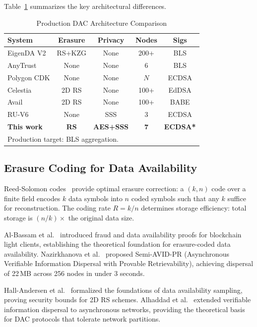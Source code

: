 Table~\ref{tab:dac-comparison} summarizes the key architectural
differences.

\begin{table}[t]
\centering
\caption{Production DAC Architecture Comparison}
\label{tab:dac-comparison}
\begin{tabular}{@{}lcccc@{}}
\toprule
\textbf{System} & \textbf{Erasure} & \textbf{Privacy} & \textbf{Nodes} & \textbf{Sigs} \\
\midrule
EigenDA V2  & RS+KZG  & None   & 200+  & BLS    \\
AnyTrust    & None    & None   & 6     & BLS    \\
Polygon CDK & None    & None   & $N$   & ECDSA  \\
Celestia    & 2D RS   & None   & 100+  & EdDSA  \\
Avail       & 2D RS   & None   & 100+  & BABE   \\
RU-V6       & None    & SSS    & 3     & ECDSA  \\
\textbf{This work} & \textbf{RS} & \textbf{AES+SSS} & \textbf{7} & \textbf{ECDSA*} \\
\bottomrule
\multicolumn{5}{l}{\footnotesize *Production target: BLS aggregation.} \\
\end{tabular}
\end{table}

\subsection{Erasure Coding for Data Availability}

Reed-Solomon codes~\cite{reedsolomon1960} provide optimal erasure
correction: a $(k,n)$ code over a finite field encodes $k$ data symbols
into $n$ coded symbols such that any $k$ suffice for reconstruction. The
coding rate $R = k/n$ determines storage efficiency: total storage is
$(n/k)\times$ the original data size.

Al-Bassam et al.~\cite{albassam2018fraud} introduced fraud and data
availability proofs for blockchain light clients, establishing the
theoretical foundation for erasure-coded data availability. Nazirkhanova
et al.~\cite{nazirkhanova2021} proposed Semi-AVID-PR (Asynchronous
Verifiable Information Dispersal with Provable Retrievability), achieving
dispersal of 22\,MB across 256 nodes in under 3 seconds.

Hall-Andersen et al.~\cite{hallandersen2023} formalized the foundations
of data availability sampling, proving security bounds for 2D RS
schemes. Alhaddad et al.~\cite{alhaddad2022} extended verifiable
information dispersal to asynchronous networks, providing the
theoretical basis for DAC protocols that tolerate network partitions.

